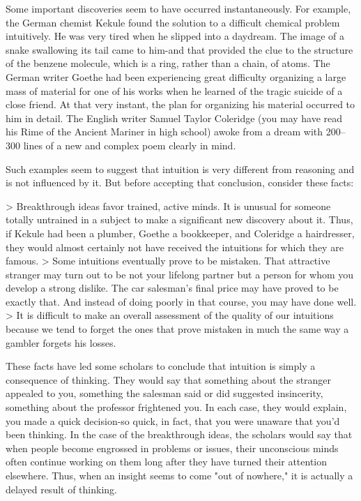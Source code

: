 \documentclass{book}
\begin{document}
Some important discoveries seem to have occurred instantaneously. For example, the German chemist Kekule found the solution to a difficult chemical problem intuitively. He was very tired when he slipped into a daydream. The image of a snake swallowing its tail came to him-and that provided the clue to the structure of the benzene molecule, which is a ring, rather than a chain, of atoms. The German writer Goethe had been experiencing great difficulty organizing a large mass of material for one of his works when he learned of the tragic suicide of a close friend. At that very instant, the plan for organizing his material occurred to him in detail. The English writer Samuel Taylor Coleridge (you may have read his Rime of the Ancient Mariner in high school) awoke from a dream with 200–300 lines of a new and complex poem clearly in mind.

Such examples seem to suggest that intuition is very different from reasoning and is not influenced by it. But before accepting that conclusion, consider these facts:

> Breakthrough ideas favor trained, active minds. It is unusual for someone totally untrained in a subject to make a significant new discovery about it. Thus, if Kekule had been a plumber, Goethe a bookkeeper, and Coleridge a hairdresser, they would almost certainly not have received the intuitions for which they are famous.
> Some intuitions eventually prove to be mistaken. That attractive stranger may turn out to be not your lifelong partner but a person for whom you develop a strong dislike. The car salesman’s final price may have proved to be exactly that. And instead of doing poorly in that course, you may have done well.
> It is difficult to make an overall assessment of the quality of our intuitions because we tend to forget the ones that prove mistaken in much the same way a gambler forgets his losses.

These facts have led some scholars to conclude that intuition is simply a consequence of thinking. They would say that something about the stranger appealed to you, something the salesman said or did suggested insincerity, something about the professor frightened you. In each case, they would explain, you made a quick decision-so quick, in fact, that you were unaware that you’d been thinking. In the case of the breakthrough ideas, the scholars would say that when people become engrossed in problems or issues, their unconscious minds often continue working on them long after they have turned their attention elsewhere. Thus, when an insight seems to come "out of nowhere," it is actually a delayed result of thinking.
\end{document}
